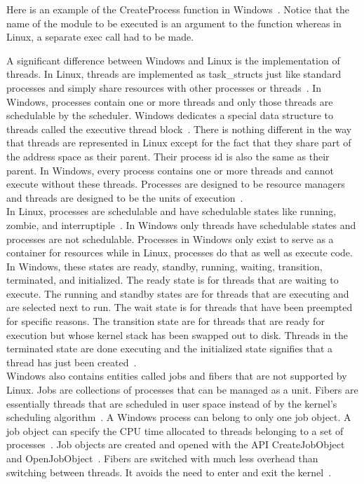 \documentclass[letterpaper,10pt,titlepage]{article}
\begin{document}


Here is an example of the CreateProcess function in Windows~\cite{msdn-cp}. Notice that the
name of the module to be executed is an argument to the function whereas in
Linux, a separate exec call had to be made.



A significant difference between Windows and Linux is the implementation of 
threads. In Linux, threads are implemented as task\_structs just like 
standard processes and simply share resources with other processes or threads~\cite{love3}.
In Windows, processes contain one or more threads and only those threads are
schedulable by the scheduler. Windows dedicates a special data structure to 
threads called the executive thread block~\cite{rsw6}. There is nothing different in the
way that threads are represented in Linux except for the fact that they share
part of the address space as their parent. Their process id is also the same
as their parent. In Windows, every process contains one or more threads
and cannot execute without these threads. Processes are designed to be 
resource managers and threads are designed to be the units of execution~\cite{tm11}.
\\
\linebreak
In Linux, processes are schedulable and have schedulable states like running,
zombie, and interruptiple~\cite{love3}. In Windows only threads have schedulable states and
processes are not schedulable. Processes in Windows only exist to serve as a
container for resources while in Linux, processes do that as well as execute 
code. In Windows, these states are ready, standby, running, waiting, 
transition, terminated, and initialized. The ready state is for threads 
that are waiting to execute. The running and standby states are for threads
that are executing and are selected next to run. The wait state is for 
threads that have been preempted for specific reasons. The transition state 
are for threads that are ready for execution but whose kernel stack has been
swapped out to disk. Threads in the terminated state are done executing
and the initialized state signifies that a thread has just been created~\cite{rsw6}. 
\\
\linebreak
Windows also contains entities called jobs and fibers that are not supported 
by Linux. Jobs are collections of processes that can be managed as a unit.
Fibers are essentially threads that are scheduled in user space instead of
by the kernel's scheduling algorithm~\cite{tm11}. A Windows process can belong to only
one job object. A job object can specify the CPU time allocated to threads
belonging to a set of processes~\cite{tm11}. Job objects are created and opened with the
API CreateJobObject and OpenJobObject~\cite{msdn-proc}. Fibers are switched with much less
overhead than switching between threads. It avoids the need to enter and 
exit the kernel~\cite{tm11}.
\end{document}
